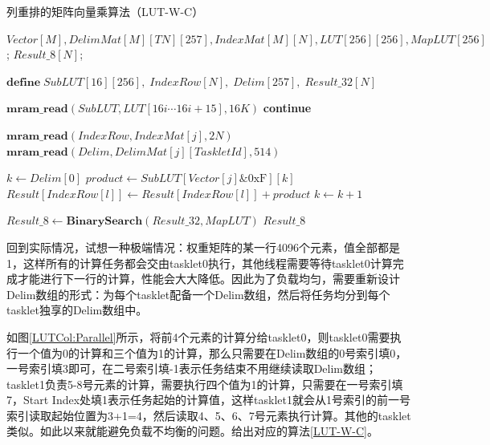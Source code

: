 \begin{algorithm}[!htbp]
    \caption{列重排的矩阵向量乘算法（LUT-W-C）}
    \label{LUT-W-C}
    \begin{algorithmic}[1]
        \Require $Vector[M], DelimMat[M][TN][257], IndexMat[M][N], LUT[256][256], MapLUT[256]$; %
        \Ensure $Result\_8[N]$; %

        \State $\textbf{define}\; SubLUT[16][256],\;IndexRow[N],\;Delim[257],\;Result\_32[N]$

            \State $\textbf{mram\_read}(SubLUT, LUT[16i \cdots 16i + 15], 16K)$
            \Comment{\textcolor{blue}{parallel read}}
                    \State \textbf{continue}
                \EndIf
                
                \State $\textbf{mram\_read}(IndexRow, IndexMat[j], 2N)$
                \Comment{\textcolor{blue}{parallel read}}
                \State $\textbf{mram\_read}(Delim, DelimMat[j][TaskletId], 514)$

                \State $k \gets Delim[0]$
                    \State $product \gets SubLUT[Vector[j] \& \text{0xF}][k]$
                        \State $Result[IndexRow[l]] \gets Result[IndexRow[l]] + product$
                    \EndFor
                    \State $k \gets k + 1$
                \EndWhile
            \EndFor
        \EndFor

        \State $Result\_8 \gets \textbf{BinarySearch}(Result\_32, MapLUT)$
        \Comment{\textcolor{blue}{parallel in N}}
        \State \Return $Result\_8$
    \end{algorithmic}
\end{algorithm}

回到实际情况，试想一种极端情况：权重矩阵的某一行4096个元素，值全部都是1，这样所有的计算任务都会交由tasklet0执行，其他线程需要等待tasklet0计算完成才能进行下一行的计算，性能会大大降低。因此为了负载均匀，需要重新设计Delim数组的形式：为每个tasklet配备一个Delim数组，然后将任务均分到每个tasklet独享的Delim数组中。

如图\ref{LUTCol:Parallel}所示，将前4个元素的计算分给tasklet0，则tasklet0需要执行一个值为0的计算和三个值为1的计算，那么只需要在Delim数组的0号索引填0，一号索引填3即可，在二号索引填-1表示任务结束不用继续读取Delim数组；tasklet1负责5-8号元素的计算，需要执行四个值为1的计算，只需要在一号索引填7，Start Index处填1表示任务起始的计算值，这样tasklet1就会从1号索引的前一号索引读取起始位置为3+1=4，然后读取4、5、6、7号元素执行计算。其他的tasklet类似。如此以来就能避免负载不均衡的问题。给出对应的算法\ref{LUT-W-C}。

